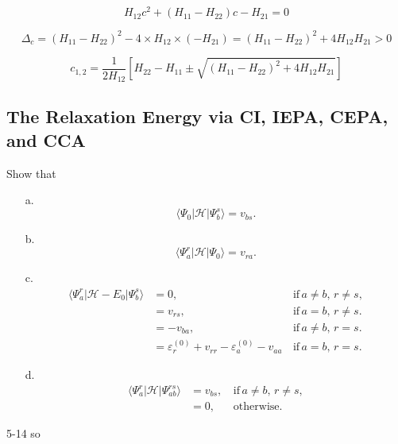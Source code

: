\documentclass[a4paper]{book}
\newcounter{exercise}[chapter]
\newcounter{solution}[chapter]
\begin{document}
	\begin{solution}
	
	\[
		H_{12} c^2 + ( H_{11} - H_{22} ) c - H_{21} = 0
	\]	
	
	\[
		\Delta_c = ( H_{11} - H_{22} )^2 - 4 \times H_{12} \times ( - H_{21} ) = ( H_{11} - H_{22} )^2 + 4 H_{12} H_{21} > 0
	\]
	
	\[
		c_{1,2} = \frac{1}{ 2H_{12} } \left[ H_{22} - H_{11} \pm \sqrt{ ( H_{11} - H_{22} )^2 + 4 H_{12} H_{21} } \right]
	\]
	
	\end{solution}
	
	\subsection{The Relaxation Energy via CI, IEPA, CEPA, and CCA}
	
	\begin{exercise}
	Show that
	\begin{enumerate}
	
	\item[a.]
	\[
		\langle \Psi_0 | \mathscr{H} | \Psi^s_b \rangle = v_{bs}.
	\]
	
	\item[b.] 
	\[
		\langle \Psi^r_a | \mathscr{H} | \Psi_0 \rangle = v_{ra}.
	\]
	
	\item[c.]
	\begin{align*}
	\langle \Psi^r_a | \mathscr{H} - E_0 | \Psi^s_b \rangle &= 0 , &\,\text{if} \, a\neq b, \, r \neq s, \\
	&= v_{rs} , &\,\text{if} \, a = b , \, r \neq s. \\
	&= -v_{ba} , &\,\text{if} \, a \neq b , \, r = s. \\
	&= \varepsilon^{(0)}_r + v_{rr} - \varepsilon^{(0)}_a - v_{aa} &\, \text{if} \, a = b , \, r = s.
	\end{align*}		
	
	\item[d.] 
	\begin{align*}
	\langle \Psi^r_a | \mathscr{H} | \Psi^{rs}_{ab} \rangle &= v_{bs} , &\,\text{if} \, a \neq b, \, r \neq s, \\
	&=0, &\,\text{otherwise}.
	\end{align*}	
	
	\end{enumerate}
	\end{exercise}
	
	\begin{solution}
		5-14 so
	\end{solution}
	
\end{document}
